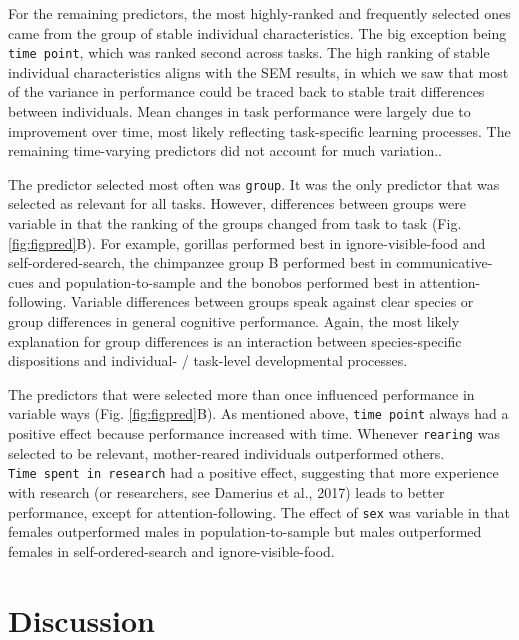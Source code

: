 \documentclass[
  man,floatsintext]{apa6}
\begin{document}
For the remaining predictors, the most highly-ranked and frequently selected ones came from the group of stable individual characteristics. The big exception being \texttt{time\ point}, which was ranked second across tasks. The high ranking of stable individual characteristics aligns with the SEM results, in which we saw that most of the variance in performance could be traced back to stable trait differences between individuals. Mean changes in task performance were largely due to improvement over time, most likely reflecting task-specific learning processes. The remaining time-varying predictors did not account for much variation..

The predictor selected most often was \texttt{group}. It was the only predictor that was selected as relevant for all tasks. However, differences between groups were variable in that the ranking of the groups changed from task to task (Fig. \ref{fig:figpred}B). For example, gorillas performed best in ignore-visible-food and self-ordered-search, the chimpanzee group B performed best in communicative-cues and population-to-sample and the bonobos performed best in attention-following. Variable differences between groups speak against clear species or group differences in general cognitive performance. Again, the most likely explanation for group differences is an interaction between species-specific dispositions and individual- / task-level developmental processes.

The predictors that were selected more than once influenced performance in variable ways (Fig. \ref{fig:figpred}B). As mentioned above, \texttt{time\ point} always had a positive effect because performance increased with time. Whenever \texttt{rearing} was selected to be relevant, mother-reared individuals outperformed others. \texttt{Time\ spent\ in\ research} had a positive effect, suggesting that more experience with research (or researchers, see Damerius et al., 2017) leads to better performance, except for attention-following. The effect of \texttt{sex} was variable in that females outperformed males in population-to-sample but males outperformed females in self-ordered-search and ignore-visible-food.

\section{Discussion}\label{discussion}
\end{document}
